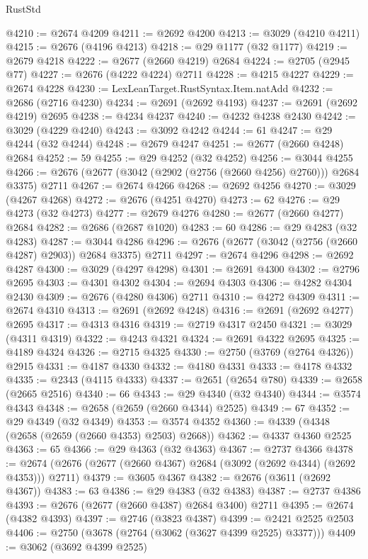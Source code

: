 \begin{lexlean}{RustStd}
\begin{coremodule}
{\begin{coremodule}
{{{{{{{{{{{{{{{{{{{{{{{{{{{{{{{{{{{{{{{{{{{{{{{{{{{{{{{@4210 := @2674 @4209
@4211 := @2692 @4200
@4213 := @3029 (@4210 @4211)
@4215 := @2676 (@4196 @4213)
@4218 := @29 @1177 (@32 @1177)
@4219 := @2679 @4218
@4222 := @2677 (@2660 @4219) @2684
@4224 := @2705 (@2945 @77)
@4227 := @2676 (@4222 @4224) @2711
@4228 := @4215 @4227
@4229 := @2674 @4228
@4230 := LexLeanTarget.RustSyntax.Item.natAdd
@4232 := @2686 (@2716 @4230)
@4234 := @2691 (@2692 @4193)
@4237 := @2691 (@2692 @4219) @2695
@4238 := @4234 @4237
@4240 := @4232 @4238 @2430
@4242 := @3029 (@4229 @4240)
@4243 := @3092 @4242
@4244 := 61
@4247 := @29 @4244 (@32 @4244)
@4248 := @2679 @4247
@4251 := @2677 (@2660 @4248) @2684
@4252 := 59
@4255 := @29 @4252 (@32 @4252)
@4256 := @3044 @4255
@4266 := @2676 (@2677 (@3042 (@2902 (@2756 (@2660 @4256) @2760))) @2684 @3375) @2711
@4267 := @2674 @4266
@4268 := @2692 @4256
@4270 := @3029 (@4267 @4268)
@4272 := @2676 (@4251 @4270)
@4273 := 62
@4276 := @29 @4273 (@32 @4273)
@4277 := @2679 @4276
@4280 := @2677 (@2660 @4277) @2684
@4282 := @2686 (@2687 @1020)
@4283 := 60
@4286 := @29 @4283 (@32 @4283)
@4287 := @3044 @4286
@4296 := @2676 (@2677 (@3042 (@2756 (@2660 @4287) @2903)) @2684 @3375) @2711
@4297 := @2674 @4296
@4298 := @2692 @4287
@4300 := @3029 (@4297 @4298)
@4301 := @2691 @4300
@4302 := @2796 @2695
@4303 := @4301 @4302
@4304 := @2694 @4303
@4306 := @4282 @4304 @2430
@4309 := @2676 (@4280 @4306) @2711
@4310 := @4272 @4309
@4311 := @2674 @4310
@4313 := @2691 (@2692 @4248)
@4316 := @2691 (@2692 @4277) @2695
@4317 := @4313 @4316
@4319 := @2719 @4317 @2450
@4321 := @3029 (@4311 @4319)
@4322 := @4243 @4321
@4324 := @2691 @4322 @2695
@4325 := @4189 @4324
@4326 := @2715 @4325
@4330 := @2750 (@3769 (@2764 @4326)) @2915
@4331 := @4187 @4330
@4332 := @4180 @4331
@4333 := @4178 @4332
@4335 := @2343 (@4115 @4333)
@4337 := @2651 (@2654 @780)
@4339 := @2658 (@2665 @2516)
@4340 := 66
@4343 := @29 @4340 (@32 @4340)
@4344 := @3574 @4343
@4348 := @2658 (@2659 (@2660 @4344) @2525)
@4349 := 67
@4352 := @29 @4349 (@32 @4349)
@4353 := @3574 @4352
@4360 := @4339 (@4348 (@2658 (@2659 (@2660 @4353) @2503) @2668))
@4362 := @4337 @4360 @2525
@4363 := 65
@4366 := @29 @4363 (@32 @4363)
@4367 := @2737 @4366
@4378 := @2674 (@2676 (@2677 (@2660 @4367) @2684 (@3092 (@2692 @4344) (@2692 @4353))) @2711)
@4379 := @3605 @4367
@4382 := @2676 (@3611 (@2692 @4367))
@4383 := 63
@4386 := @29 @4383 (@32 @4383)
@4387 := @2737 @4386
@4393 := @2676 (@2677 (@2660 @4387) @2684 @3400) @2711
@4395 := @2674 (@4382 @4393)
@4397 := @2746 (@3823 @4387)
@4399 := @2421 @2525 @2503
@4406 := @2750 (@3678 (@2764 (@3062 (@3627 @4399 @2525) @3377)))
@4409 := @3062 (@3692 @4399 @2525)
}}}}}}}}}}}}}}}}}}}}}}}}}}}}}}}}}}}}}}}}}}}}}}}}}}}}}}}
\end{coremodule}}
\end{coremodule}
\end{lexlean}
